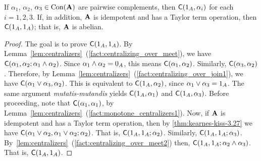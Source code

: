 \begin{lem}
If $\alpha_1$, $\alpha_2$, $\alpha_3 \in \operatorname{Con}(\mathbf{A})$ are pairwise complements,
then $\mathsf{C}(1_A, \alpha_i)$ for each $i=1,2,3$.  If, in addition, $\mathbf{A}$ is
idempotent and has a Taylor term operation, then $\mathsf{C}(1_A, 1_A)$; that is, $\mathbf{A}$ is abelian.
\end{lem}
\begin{proof}
  The goal is to prove $\mathsf{C}(1_A, 1_A)$.
  By Lemma~\ref{lem:centralizers}~(\ref{fact:centralizing_over_meet}), we have
  $\mathsf{C}(\alpha_1, \alpha_2; \alpha_1 \wedge \alpha_2)$.  
  Since $\alpha_1 \wedge \alpha_2= 0_A$, this means
  $\mathsf{C}(\alpha_1, \alpha_2)$.
  Similarly, $\mathsf{C}(\alpha_3, \alpha_2)$.  Therefore, by 
  Lemma~\ref{lem:centralizers}~(\ref{fact:centralizing_over_join1}), we have
  $\mathsf{C}(\alpha_1 \vee \alpha_3, \alpha_2)$. This is equivalent to 
  $\mathsf{C}(1_A, \alpha_2)$, since $\alpha_1 \vee \alpha_3 = 1_A$. 
  The same argument \emph{mutatis-mutandis} yields
  $\mathsf{C}(1_A,\alpha_1)$ and $\mathsf{C}(1_A,\alpha_3)$. 
  Before proceeding, note that $\mathsf{C}(\alpha_1, \alpha_1)$, by 
  Lemma~\ref{lem:centralizers}~(\ref{fact:monotone_centralizers1}).
  Now, if $\mathbf{A}$ is idempotent and has a Taylor term operation, then
  by \ref{thm:kearnes-kiss-3.27} we have 
  $\mathsf{C}(\alpha_1 \vee \alpha_2,\alpha_1 \vee \alpha_2; \alpha_2)$.
  That is, $\mathsf{C}(1_A,1_A; \alpha_2)$.
  Similarly, $\mathsf{C}(1_A,1_A; \alpha_3)$.
  By~\ref{lem:centralizers}~(\ref{fact:centralizing_over_meet2}) then, 
  $\mathsf{C}(1_A,1_A; \alpha_2 \wedge\alpha_3)$. 
  That is, $\mathsf{C}(1_A,1_A)$.
\end{proof}












































